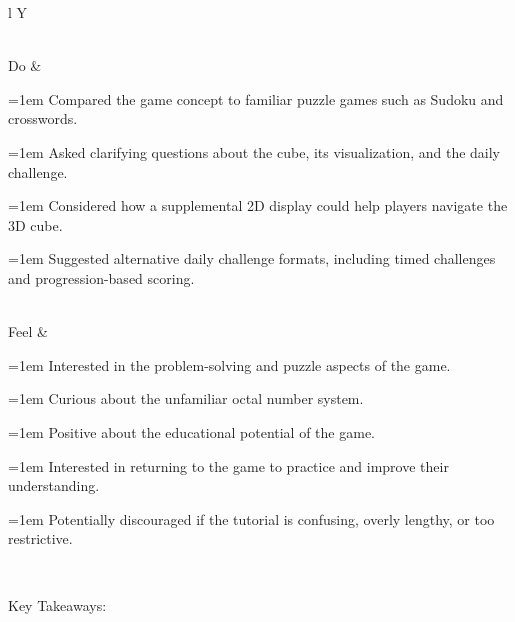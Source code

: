 \documentclass{article}
\newcommand{\cellbullet}{\par\noindent\hangindent=1em\hangafter=1%
  \makebox[1em][l]{\textbullet}\ignorespaces}
\newenvironment{empathylist}
  {\begin{minipage}[t]{\linewidth}\let\item\cellbullet}
  {\strut\end{minipage}}
\begin{document}
\begin{tabularx}{\textwidth}{l Y}
\begin{empathylist}
\end{empathylist} \\
\midrule
Do &
\begin{empathylist}
  \item Compared the game concept to familiar puzzle games such as Sudoku and crosswords.
  \item Asked clarifying questions about the cube, its visualization, and the daily challenge.
  \item Considered how a supplemental 2D display could help players navigate the 3D cube.
  \item Suggested alternative daily challenge formats, including timed challenges and progression-based scoring.
\end{empathylist}\\
\midrule
Feel &
\begin{empathylist}
  \item Interested in the problem-solving and puzzle aspects of the game.
  \item Curious about the unfamiliar octal number system.
  \item Positive about the educational potential of the game.
  \item Interested in returning to the game to practice and improve their understanding.
  \item Potentially discouraged if the tutorial is confusing, overly lengthy, or too restrictive.
\end{empathylist} \\
\end{tabularx}

Key Takeaways:
\end{document}
